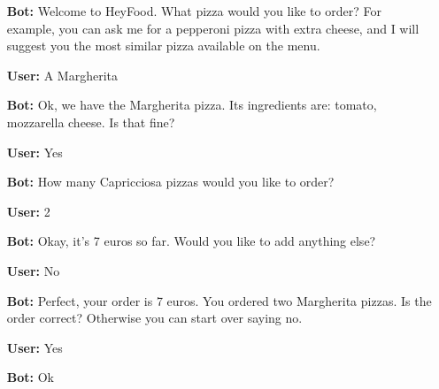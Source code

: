 \begin{itemize}

\item[\textbf{Bot:}] Welcome to HeyFood.
What pizza would you like to order? For example, you can ask me for a pepperoni pizza with extra cheese, and I will suggest you the most similar pizza available on the menu.


\item[\textbf{User:}] A Margherita

\item[\textbf{Bot:}] Ok, we have the Margherita pizza. Its ingredients are: tomato, mozzarella cheese. Is that fine?

\item[\textbf{User:}]Yes

\item[\textbf{Bot:}] How many Capricciosa pizzas would you like to order?

\item[\textbf{User:}]2

\item[\textbf{Bot:}]Okay, it’s 7 euros so far. Would you like to add anything else?

\item[\textbf{User:}]No

\item[\textbf{Bot:}] Perfect, your order is 7 euros. You ordered  two Margherita pizzas. Is the order correct? Otherwise you can start over saying no.

\item[\textbf{User:}]Yes

\item[\textbf{Bot:}]Ok

\end{itemize}

